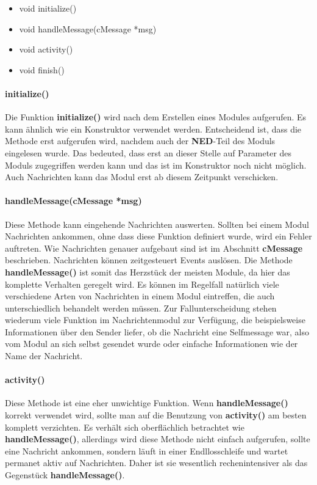 \begin{itemize}
\item void initialize()
\item void handleMessage(cMessage *msg)
\item void activity()
\item void finish()
\end{itemize}

\paragraph{initialize()}

Die Funktion \textbf{initialize()} wird nach dem Erstellen eines Modules aufgerufen. Es kann ähnlich wie ein Konstruktor verwendet werden. Entscheidend ist, dass die Methode erst aufgerufen wird, nachdem auch der \textbf{NED}-Teil des Moduls eingelesen wurde. Das bedeuted, dass erst an dieser Stelle auf Parameter des Moduls zugegriffen werden kann und das ist im Konstruktor noch nicht möglich. Auch Nachrichten kann das Modul erst ab diesem Zeitpunkt verschicken. 

\paragraph{handleMessage(cMessage *msg)}

Diese Methode kann eingehende Nachrichten auswerten. Sollten bei einem Modul Nachrichten ankommen, ohne dass diese Funktion definiert wurde, wird ein Fehler auftreten. Wie Nachrichten genauer aufgebaut sind ist im Abschnitt \textbf{cMessage} beschrieben.
Nachrichten können zeitgesteuert Events auslösen. Die Methode \textbf{handleMessage()} ist somit das Herzstück der meisten Module, da hier das komplette Verhalten geregelt wird. \newline
Es können im Regelfall natürlich viele verschiedene Arten von Nachrichten in einem Modul eintreffen, die auch unterschiedlich behandelt werden müssen. Zur Fallunterscheidung stehen wiederum viele Funktion im Nachrichtenmodul zur Verfügung, die beispielsweise Informationen über den Sender liefer, ob die Nachricht eine Selfmessage war, also vom Modul an sich selbst gesendet wurde oder einfache Informationen wie der Name der Nachricht.

\paragraph{activity()}

Diese Methode ist eine eher unwichtige Funktion. Wenn \textbf{handleMessage()} korrekt verwendet wird, sollte man auf die Benutzung von \textbf{activity()} am besten komplett verzichten. Es verhält sich oberflächlich betrachtet wie \textbf{handleMessage()}, allerdings wird diese Methode nicht einfach aufgerufen, sollte eine Nachricht ankommen, sondern läuft in einer Endllosschleife und wartet permanet aktiv auf Nachrichten. Daher ist sie wesentlich rechenintensiver als das Gegenstück \textbf{handleMessage()}.

